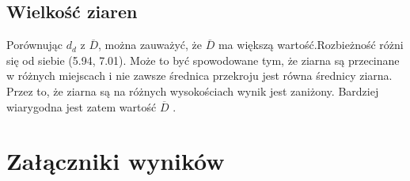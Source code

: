 \documentclass[a4paper,12pt]{article}
\begin{document}
\subsection{Wielkość ziaren}
Porównując $d_d$ z $\overline{D}$, można zauważyć, że $\overline{D}$ ma większą wartość.Rozbieżność różni się od siebie (5.94, 7.01). Może to być spowodowane tym, że ziarna są  przecinane w różnych miejscach i nie zawsze średnica przekroju jest równa średnicy ziarna. Przez to, że ziarna są na różnych wysokościach wynik jest zaniżony. Bardziej wiarygodna jest zatem wartość $\overline{D}$ .
\section{Załączniki wyników}
\end{document}
